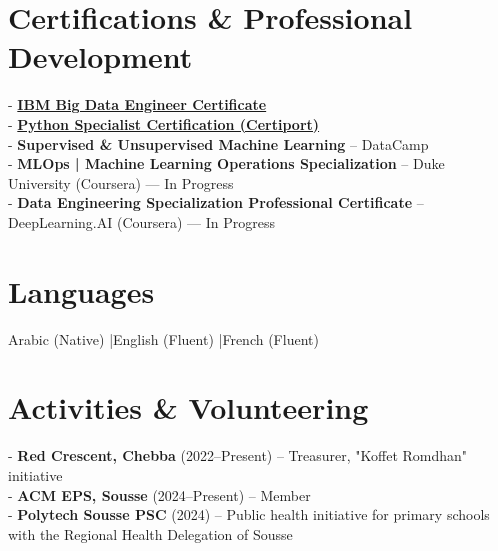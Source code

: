 \documentclass[10.5pt,a4paper]{article}
\begin{document}
\section*{Certifications \& Professional Development}
- \href{https://www.credly.com/badges/5743d473-468f-453d-84d2-47eca7fc469f}{\textbf{IBM Big Data Engineer Certificate}} \\
- \href{https://www.credly.com/badges/cebb5584-1f45-4a60-aff1-fb95e70e7eb3}{\textbf{Python Specialist Certification (Certiport)}} \\
- \textbf{Supervised \& Unsupervised Machine Learning} -- DataCamp \\
- \textbf{MLOps | Machine Learning Operations Specialization} -- Duke University (Coursera) --- In Progress \\
- \textbf{Data Engineering Specialization Professional Certificate} -- DeepLearning.AI (Coursera) --- In Progress

\section*{Languages}
Arabic (Native) \quad|\quad English (Fluent) \quad|\quad French (Fluent)

\section*{Activities \& Volunteering}
- \textbf{Red Crescent, Chebba} (2022--Present) -- Treasurer, "Koffet Romdhan" initiative \\
- \textbf{ACM EPS, Sousse} (2024--Present) -- Member \\
- \textbf{Polytech Sousse PSC} (2024) -- Public health initiative for primary schools with the Regional Health Delegation of Sousse
\end{document}
